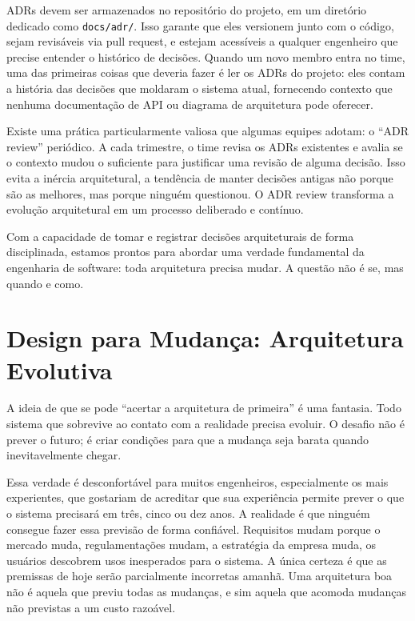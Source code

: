 ADRs devem ser armazenados no repositório do projeto, em um diretório dedicado
como \texttt{docs/adr/}. Isso garante que eles versionem junto com o código,
sejam revisáveis via pull request, e estejam acessíveis a qualquer engenheiro
que precise entender o histórico de decisões. Quando um novo membro entra no
time, uma das primeiras coisas que deveria fazer é ler os ADRs do projeto:
eles contam a história das decisões que moldaram o sistema atual, fornecendo
contexto que nenhuma documentação de API ou diagrama de arquitetura pode
oferecer.

Existe uma prática particularmente valiosa que algumas equipes adotam: o
``ADR review'' periódico. A cada trimestre, o time revisa os ADRs existentes
e avalia se o contexto mudou o suficiente para justificar uma revisão de
alguma decisão. Isso evita a inércia arquitetural, a tendência de manter
decisões antigas não porque são as melhores, mas porque ninguém questionou.
O ADR review transforma a evolução arquitetural em um processo deliberado e
contínuo.

Com a capacidade de tomar e registrar decisões arquiteturais de forma
disciplinada, estamos prontos para abordar uma verdade fundamental da
engenharia de software: toda arquitetura precisa mudar. A questão não é se,
mas quando e como.


\section{Design para Mudança: Arquitetura Evolutiva}

A ideia de que se pode ``acertar a arquitetura de primeira'' é uma fantasia.
Todo sistema que sobrevive ao contato com a realidade precisa evoluir. O
desafio não é prever o futuro; é criar condições para que a mudança seja
barata quando inevitavelmente chegar.

Essa verdade é desconfortável para muitos engenheiros, especialmente os mais
experientes, que gostariam de acreditar que sua experiência permite prever o
que o sistema precisará em três, cinco ou dez anos. A realidade é que ninguém
consegue fazer essa previsão de forma confiável. Requisitos mudam porque o
mercado muda, regulamentações mudam, a estratégia da empresa muda, os
usuários descobrem usos inesperados para o sistema. A única certeza é que
as premissas de hoje serão parcialmente incorretas amanhã. Uma arquitetura
boa não é aquela que previu todas as mudanças, e sim aquela que acomoda
mudanças não previstas a um custo razoável.

